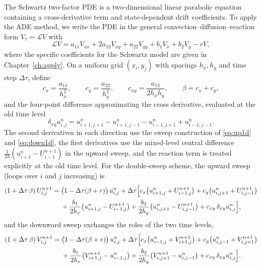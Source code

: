 \documentclass[12pt,a4paper]{article}
\begin{document}
The Schwartz two-factor PDE is a two-dimensional linear parabolic equation containing a cross-derivative term and state-dependent drift coefficients. To apply the ADE method, we write the PDE in the general convection--diffusion--reaction form $V_\tau=\mathcal{L}V$ with
\begin{equation}\label{eq:Lgen}
\mathcal{L}V=a_{11}V_{xx}+2a_{12}V_{xy}+a_{22}V_{yy}+b_1V_x+b_2V_y-rV,
\end{equation}
where the specific coefficients for the Schwartz model are given in Chapter~\ref{ch:apply}. On a uniform grid $(x_i,y_j)$ with spacings $h_x,h_y$ and time step $\Delta\tau$, define
\begin{equation}
c_x=\frac{a_{11}}{h_x^2},\qquad c_y=\frac{a_{22}}{h_y^2},\qquad c_{xy}=\frac{a_{12}}{2h_xh_y},\qquad \beta=c_x+c_y,
\end{equation}
and the four-point difference approximating the cross derivative, evaluated at the old time level
\begin{equation}
\delta_{xy}u^n_{i,j}=u^n_{i+1,j+1}-u^n_{i+1,j-1}-u^n_{i-1,j+1}+u^n_{i-1,j-1}.
\end{equation}
The second derivatives in each direction use the sweep construction of \eqref{eq:up1d} and \eqref{eq:down1d}, the first derivatives use the mixed-level central difference $\frac{1}{2h}(u^{n}_{i+1}-U^{n+1}_{i-1})$ in the upward sweep, and the reaction term is treated explicitly at the old time level. For the double-sweep scheme, the upward sweep (loops over $i$ and $j$ increasing) is
\begin{align}
(1+\Delta\tau\,\beta)\,U_{i,j}^{n+1}={}&\big(1-\Delta\tau(\beta+r)\big)\,u_{i,j}^n+\Delta\tau\Big[c_x\big(u_{i+1,j}^{n}+U_{i-1,j}^{n+1}\big)+c_y\big(u_{i,j+1}^{n}+U_{i,j-1}^{n+1}\big)\notag\\
&+\frac{b_1}{2h_x}\big(u_{i+1,j}^{n}-U_{i-1,j}^{n+1}\big)+\frac{b_2}{2h_y}\big(u_{i,j+1}^{n}-U_{i,j-1}^{n+1}\big)+c_{xy}\,\delta_{xy}u^n_{i,j}\Big],\label{eq:up2d}
\end{align}
and the downward sweep exchanges the roles of the two time levels,
\begin{align}
(1+\Delta\tau\,\beta)\,V_{i,j}^{n+1}={}&\big(1-\Delta\tau(\beta+r)\big)\,u_{i,j}^n+\Delta\tau\Big[c_x\big(u_{i-1,j}^{n}+V_{i+1,j}^{n+1}\big)+c_y\big(u_{i,j-1}^{n}+V_{i,j+1}^{n+1}\big)\notag\\
&+\frac{b_1}{2h_x}\big(V_{i+1,j}^{n+1}-u_{i-1,j}^{n}\big)+\frac{b_2}{2h_y}\big(V_{i,j+1}^{n+1}-u_{i,j-1}^{n}\big)+c_{xy}\,\delta_{xy}u^n_{i,j}\Big].\label{eq:down2d}
\end{align}
\end{document}
